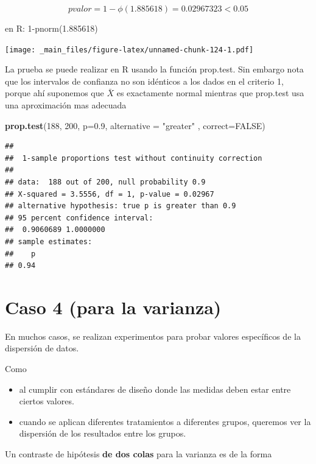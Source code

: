 \documentclass[
]{book}
\newenvironment{Shaded}{\begin{snugshade}}{\end{snugshade}}
\newcommand{\AttributeTok}[1]{\textcolor[rgb]{0.13,0.29,0.53}{#1}}
\newcommand{\ConstantTok}[1]{\textcolor[rgb]{0.56,0.35,0.01}{#1}}
\newcommand{\DecValTok}[1]{\textcolor[rgb]{0.00,0.00,0.81}{#1}}
\newcommand{\FloatTok}[1]{\textcolor[rgb]{0.00,0.00,0.81}{#1}}
\newcommand{\FunctionTok}[1]{\textcolor[rgb]{0.13,0.29,0.53}{\textbf{#1}}}
\newcommand{\NormalTok}[1]{#1}
\newcommand{\StringTok}[1]{\textcolor[rgb]{0.31,0.60,0.02}{#1}}
\begin{document}
\[pvalor=1-\phi(1.885618)=0.02967323<0.05\]

en R: 1-pnorm(1.885618)

\texttt{[image: \_main\_files/figure-latex/unnamed-chunk-124-1.pdf]}

La prueba se puede realizar en R usando la función prop.test. Sin embargo nota que los intervalos de confianza no son idénticos a los dados en el criterio 1, porque ahí suponemos que \(\bar{X}\) es exactamente normal mientras que prop.test usa una aproximación mas adecuada

\begin{Shaded}
\begin{Highlighting}[]
\FunctionTok{prop.test}\NormalTok{(}\DecValTok{188}\NormalTok{, }\DecValTok{200}\NormalTok{, }\AttributeTok{p=}\FloatTok{0.9}\NormalTok{, }\AttributeTok{alternative =} \StringTok{"greater"}\NormalTok{ , }\AttributeTok{correct=}\ConstantTok{FALSE}\NormalTok{)}
\end{Highlighting}
\end{Shaded}

\begin{verbatim}
## 
##  1-sample proportions test without continuity correction
## 
## data:  188 out of 200, null probability 0.9
## X-squared = 3.5556, df = 1, p-value = 0.02967
## alternative hypothesis: true p is greater than 0.9
## 95 percent confidence interval:
##  0.9060689 1.0000000
## sample estimates:
##    p 
## 0.94
\end{verbatim}

\hypertarget{caso-4-para-la-varianza}{%
\section{Caso 4 (para la varianza)}\label{caso-4-para-la-varianza}}

En muchos casos, se realizan experimentos para probar valores específicos de la dispersión de datos.

Como

\begin{itemize}
\item
  al cumplir con estándares de diseño donde las medidas deben estar entre ciertos valores.
\item
  cuando se aplican diferentes tratamientos a diferentes grupos, queremos ver la dispersión de los resultados entre los grupos.
\end{itemize}

Un contraste de hipótesis \textbf{de dos colas} para la varianza es de la forma
\end{document}
